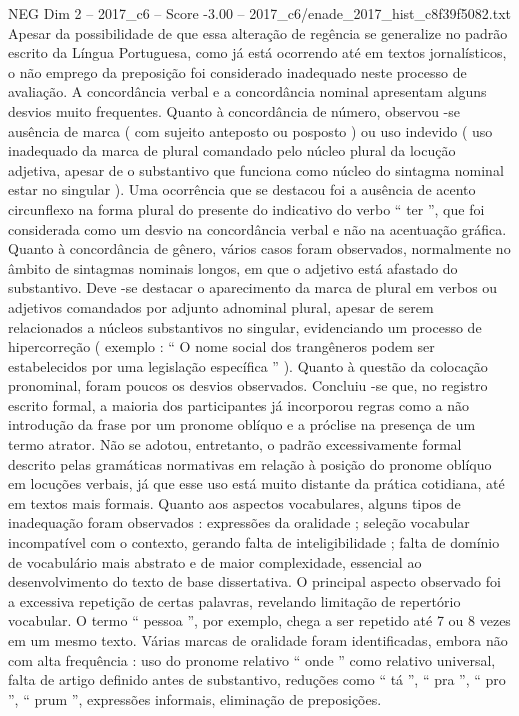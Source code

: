 \begin{textsample}{NEG Dim 2 – 2017\_c6 – Score -3.00 – 2017\_c6/enade\_2017\_hist\_c8f39f5082.txt}
Apesar da possibilidade de que essa alteração de regência se generalize no padrão escrito da Língua Portuguesa, como já está ocorrendo até em textos jornalísticos, o não emprego da preposição foi considerado inadequado neste processo de avaliação.
A concordância verbal e a concordância nominal apresentam alguns desvios muito frequentes.
Quanto à concordância de número, observou -se ausência de marca ( com sujeito anteposto ou posposto ) ou uso indevido ( uso inadequado da marca de plural comandado pelo núcleo plural da locução adjetiva, apesar de o substantivo que funciona como núcleo do sintagma nominal estar no singular ).
Uma ocorrência que se destacou foi a ausência de acento circunflexo na forma plural do presente do indicativo do verbo “ ter ”, que foi considerada como um desvio na concordância verbal e não na acentuação gráfica.
Quanto à concordância de gênero, vários casos foram observados, normalmente no âmbito de sintagmas nominais longos, em que o adjetivo está afastado do substantivo.
Deve -se destacar o aparecimento da marca de plural em verbos ou adjetivos comandados por adjunto adnominal plural, apesar de serem relacionados a núcleos substantivos no singular, evidenciando um processo de hipercorreção ( exemplo : “ O nome social dos trangêneros podem ser estabelecidos por uma legislação específica ” ).
Quanto à questão da colocação pronominal, foram poucos os desvios observados.
Concluiu -se que, no registro escrito formal, a maioria dos participantes já incorporou regras como a não introdução da frase por um pronome oblíquo e a próclise na presença de um termo atrator.
Não se adotou, entretanto, o padrão excessivamente formal descrito pelas gramáticas normativas em relação à posição do pronome oblíquo em locuções verbais, já que esse uso está muito distante da prática cotidiana, até em textos mais formais.
Quanto aos aspectos vocabulares, alguns tipos de inadequação foram observados : expressões da oralidade ; seleção vocabular incompatível com o contexto, gerando falta de inteligibilidade ; falta de domínio de vocabulário mais abstrato e de maior complexidade, essencial ao desenvolvimento do texto de base dissertativa.
O principal aspecto observado foi a excessiva repetição de certas palavras, revelando limitação de repertório vocabular.
O termo “ pessoa ”, por exemplo, chega a ser repetido até 7 ou 8 vezes em um mesmo texto.
Várias marcas de oralidade foram identificadas, embora não com alta frequência : uso do pronome relativo “ onde ” como relativo universal, falta de artigo definido antes de substantivo, reduções como “ tá ”, “ pra ”, “ pro ”, “ prum ”, expressões informais, eliminação de preposições.

\end{textsample}
